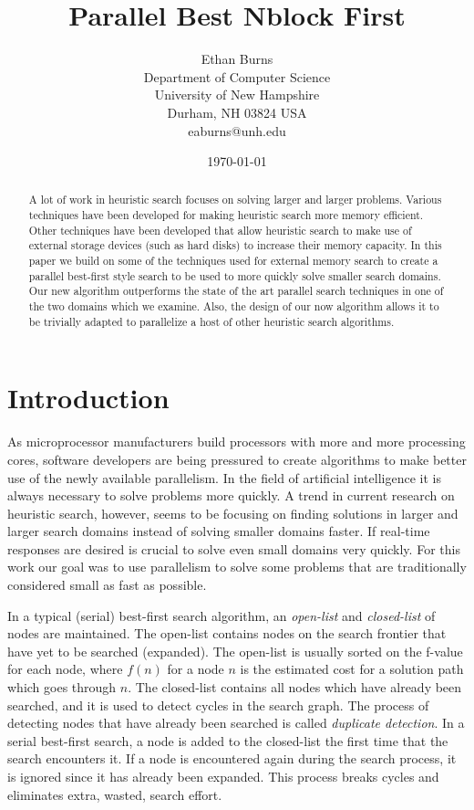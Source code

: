 \documentclass{article}
\title{Parallel Best Nblock First}
\author{Ethan Burns \\
  Department of Computer Science \\
  University of New Hampshire \\
  Durham, NH 03824 USA \\
  eaburns@unh.edu}
\date{\today}
\begin{document}
\maketitle

\begin{abstract}
  A lot of work in heuristic search focuses on solving larger and
  larger problems.  Various techniques have been developed for making
  heuristic search more memory efficient.  Other techniques have been
  developed that allow heuristic search to make use of external
  storage devices (such as hard disks) to increase their memory
  capacity.  In this paper we build on some of the techniques used for
  external memory search to create a parallel best-first style search
  to be used to more quickly solve smaller search domains.  Our new
  algorithm outperforms the state of the art parallel search
  techniques in one of the two domains which we examine.  Also, the
  design of our now algorithm allows it to be trivially adapted to
  parallelize a host of other heuristic search algorithms.
\end{abstract}

\section{Introduction}

As microprocessor manufacturers build processors with more and more
processing cores, software developers are being pressured to create
algorithms to make better use of the newly available parallelism.  In
the field of artificial intelligence it is always necessary to solve
problems more quickly.  A trend in current research on heuristic
search, however, seems to be focusing on finding solutions in larger
and larger search domains instead of solving smaller domains faster.
If real-time responses are desired is crucial to solve even small
domains very quickly.  For this work our goal was to use parallelism
to solve some problems that are traditionally considered small as fast
as possible.

In a typical (serial) best-first search algorithm, an \emph{open-list}
and \emph{closed-list} of nodes are maintained.  The open-list
contains nodes on the search frontier that have yet to be searched
(expanded).  The open-list is usually sorted on the f-value for each
node, where $f(n)$ for a node $n$ is the estimated cost for a solution
path which goes through $n$.  The closed-list contains all nodes which
have already been searched, and it is used to detect cycles in the
search graph.  The process of detecting nodes that have already been
searched is called \emph{duplicate detection}.  In a serial best-first
search, a node is added to the closed-list the first time that the
search encounters it.  If a node is encountered again during the
search process, it is ignored since it has already been expanded.
This process breaks cycles and eliminates extra, wasted, search
effort.
\end{document}
